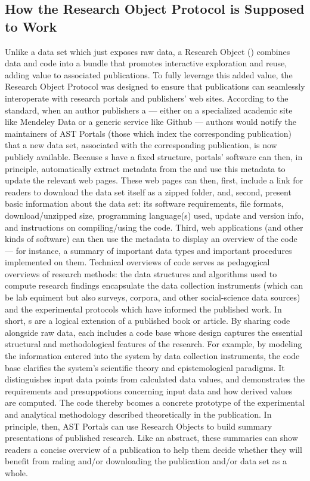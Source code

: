 \documentclass[10pt,letterpaper]{article}
\begin{document}
\subsection{How the Research Object Protocol is Supposed to Work}
Unlike a data set which just exposes raw data, a 
Research Object ({\RO}) combines data and code into a bundle 
that promotes interactive exploration and reuse, 
adding value to associated publications.  
To fully leverage this added value, the Research Object 
Protocol was designed to ensure that {\RO} 
publications can seamlessly interoperate 
with research portals and publishers' web sites.
\p{}
According to the standard, when an author publishers a 
{\RO} --- either on a specialized academic 
site like Mendeley Data or a generic service like 
Github --- authors would notify the maintainers of 
AST Portals (those which index the corresponding publication) 
that a new data set, associated with the corresponding 
publication, is now publicly available.  Because 
{\RO}s have a fixed structure, portals' 
software can then, in principle, automatically 
extract metadata from the {\RO} and 
use this metadata to update the relevant web pages. 
\p{} 
These web pages can 
then, first, include a link for readers to 
download the data set itself as a zipped folder, 
and, second, present basic information about 
the data set: its software requirements, 
file formats, download/unzipped size, programming 
language(s) used, update and version info, and 
instructions on compiling/using the 
{\RO} code.  Third, 
web applications (and other kinds of software) can then use 
the {\RO} metadata to display an overview of 
the {\RO} code --- for instance, a summary of 
important data types and important procedures implemented on them.  
Technical overviews of {\RO} code 
serves as pedagogical overviews of research 
methods: the data structures and algorithms used to compute 
research findings encapsulate the data collection 
instruments (which can be lab equiment but also surveys, 
corpora, and other social-science data sources) 
and the experimental protocols which have informed 
the published work.
\p{} 
In short, {\RO}s are a logical extension of a 
published book or article.  By sharing code alongside raw 
data, each {\RO} includes a code base whose 
design captures the essential structural and methodological 
features of the research.  For example, by 
modeling the information entered into the system by 
data collection instruments, the {\RO} 
code base clarifies the system's scientific theory and 
epistemological paradigms.  It distinguishes 
input data points from calculated data values, and 
demonstrates the requirements and presuppotions 
concerning input data and how derived values 
are computed.  The 
{\RO} code thereby bcomes a concrete 
prototype of the experimental and analytical 
methodology described theoretically in the publication.
\p{}
In principle, then, AST  
Portals can use Research Objects to build summary 
presentations of published research.  Like an 
abstract, these summaries can show readers a 
concise overview of a publication to help them 
decide whether they will benefit from rading and/or 
downloading the publication and/or data set as a whole.
\p{}
\end{document}
